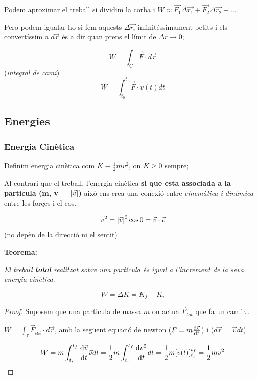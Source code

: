 \documentclass[12pt]{article}
\newcommand{\axes}[4]{%
  \draw[ax] (0,0) -- (#1,0) node[right, black] {#3};
  \draw[ax] (0,0) -- (0,#2) node[above, black] {#4};}
\begin{document}
Podem aproximar el treball si dividim la corba i $W \approx \vec{F_1}\Delta \vec{r_1} + \vec{F_2}\Delta \vec{r_2} + \dots$

Pero podem igualar-ho si fem aquests $\Delta \vec{r_i}$ infinitéssimament petits i els convertíssim a $d\vec{r}$ és a dir quan prens el límit de $\Delta r \rightarrow 0$;

\[W = \int_C \vec{F} \cdot d\vec{r}\] (\textit{integral de camí})
\[W = \int_{t_0}^t \vec{F} \cdot v(t)dt\]

\subsection{Energies}

\subsubsection{Energia Cinètica}

Definim energia cinètica com $\boxed{K \equiv \frac{1}{2}mv^2}$, on $K \geq 0$ sempre;

Al contrari que el treball, l'energia cinètica \textbf{si que esta associada a la particula (m, v = $\abs{\vec{v}}$)} això ens crea una conexió entre \textit{cinemàtica i dinàmica} entre les forçes i el cos.

\[v^2 = \abs{\vec{v}}^2 \cos 0 = \vec{v} \cdot \vec{v}\] (no depèn de la direcció ni el sentit)

\textbf{Teorema:}

\textit{El treball \textbf{total} realitzat sobre una partícula és igual a l'increment de la seva energia cinètica}.

\[W = \Delta K = K_f - K_i\]

\begin{proof}
    Suposem que una particula de massa $m$ on actua $\vec{F}_{tot}$ que fa un camí $\tau$.

    \begin{center}
\end{center}

    $W = \int_{\tau} \vec{F}_{tot}\cdot d\vec{r}$, amb la següent equació de newton ($F = m\dv{\vec{v}}{t}$) i ($d\vec{r} = \vec{v} dt$). 

    \[W = m\int_{t_i}^{t_f} \dv{\vec{v}}{t} \vec{v}dt = \frac{1}{2}m \int_{t_i}^{t_f} \dv{v^2}{t}dt = \frac{1}{2}m[v(t)]^{t_f}_{t_i}  = \frac{1}{2}mv^2\]

\end{proof}
\end{document}
